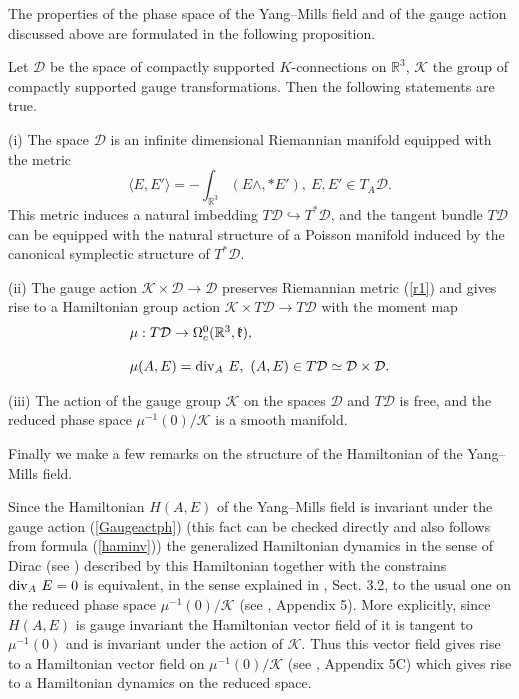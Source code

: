 \documentclass{amsart}
\begin{document}
The properties of the phase space of the Yang--Mills field
and of the gauge action discussed above are formulated in the following proposition.
\begin{proposition}\label{YMprop}
Let $\mathcal{D}$ be the space of compactly supported $K$-connections on
$\mathbb{R}^{3}$, $\mathcal{K}$ the group of compactly supported gauge
transformations. Then the following statements are true.

(i) The space $\mathcal{D}$ is an infinite dimensional Riemannian
manifold equipped with the metric
\begin{equation}\label{r1}
\langle E,E'\rangle =-\int_{\mathbb{R}^{3}}(E\wedge,*E'),~E,E'\in T_A\mathcal{D}.
\end{equation}
This metric induces a natural imbedding $T\mathcal{D}\hookrightarrow
T^*\mathcal{D}$, and the tangent bundle $T\mathcal{D}$ can be
equipped with the natural structure of a Poisson manifold induced by
the canonical symplectic structure of $T^*\mathcal{D}$.

(ii) The gauge action $\mathcal{K}\times \mathcal{D}\rightarrow \mathcal{D}$
preserves Riemannian metric (\ref{r1}) and
gives rise to a Hamiltonian group action
$\mathcal{K}\times T\mathcal{D}\rightarrow T\mathcal{D}$ with the moment map
$$
\begin{array}{l}
\mu:T\mathcal{D}\rightarrow \Omega^0_c(\mathbb{R}^{3},\mathfrak k),\\
\\
\mu(A,E)={\rm div}_A~E,~(A,E)\in T\mathcal{D}\simeq
\mathcal{D}\times\mathcal{D}.
\end{array}
$$

(iii) The action of the gauge group $\mathcal{K}$ on the spaces $\mathcal{D}$ and $T\mathcal{D}$
is free, and the reduced phase space $\mu^{-1}(0)/\mathcal{K}$ is a smooth manifold.
\end{proposition}


Finally we make a few remarks on the structure of the Hamiltonian of the
Yang--Mills field.

Since the Hamiltonian $H(A,E)$ of the Yang--Mills field is invariant under
the gauge action (\ref{Gaugeactph}) (this fact can be checked directly and
also follows from formula (\ref{haminv})) the generalized Hamiltonian
dynamics in the sense of Dirac (see \cite{Dir}) described by this Hamiltonian together with the constrains ${\rm div}_A~E=0$ is equivalent, in the sense explained in \cite {FS}, Sect. 3.2, to the usual one on the reduced phase space $\mu^{-1}(0)/\mathcal{K}$ (see \cite{A}, Appendix 5). More explicitly, since $H(A,E)$ is gauge invariant the Hamiltonian vector field of it is tangent to $\mu^{-1}(0)$ and is invariant under the action of $\mathcal{K}$. Thus this vector field gives rise to a Hamiltonian vector field on $\mu^{-1}(0)/\mathcal{K}$ (see \cite{A}, Appendix 5C) which gives rise to a Hamiltonian dynamics on the reduced space.
\end{document}
